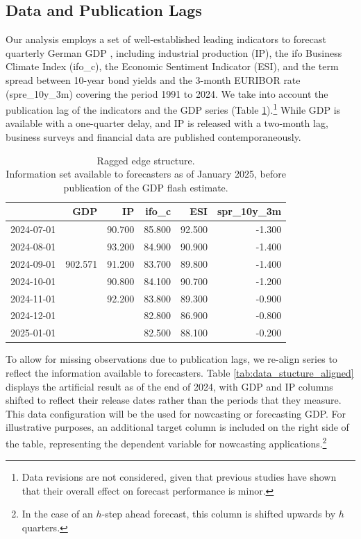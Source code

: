 \documentclass[11pt,a4paper]{article}
\begin{document}
\subsection{Data and Publication Lags}
Our analysis employs a set of well-established leading indicators to forecast quarterly German GDP \citep{Drechsel2012financial,Heinisch2018bottom}, including industrial production (IP), the ifo Business Climate Index (ifo\_c), the Economic Sentiment Indicator (ESI), and the term spread between 10-year bond yields and the 3-month EURIBOR rate (spre\_10y\_3m) covering the period 1991 to 2024. 
We take into account the publication lag of the indicators and the GDP series (Table \ref{tab:data_stucture}).\footnote{Data revisions are not considered, given that previous studies \citep{Heinisch2019} have shown that their overall effect on forecast performance is minor.} 
While GDP is available with a one-quarter delay, and IP is released with a two-month lag, business surveys and financial data are published contemporaneously.


\begin{table}[ht]
    \caption{Ragged edge structure.\\ Information set available to forecasters as of January 2025, before publication of the GDP flash estimate.} 
    \label{tab:data_stucture}
    \centering
    \begin{tabular}{rrrrrr}
      \hline
     & GDP & IP & ifo\_c & ESI & spr\_10y\_3m \\ 
      \hline
    2024-07-01 &  & 90.700 & 85.800 & 92.500 & -1.300 \\ 
      2024-08-01 &  & 93.200 & 84.900 & 90.900 & -1.400 \\ 
      2024-09-01 &902.571  & 91.200 & 83.700 & 89.800 & -1.400 \\ 
      2024-10-01 &  & 90.800 & 84.100 & 90.700 & -1.200 \\ 
      2024-11-01 &  & 92.200 & 83.800 & 89.300 & -0.900 \\ 
      2024-12-01 &  &  & 82.800 & 86.900 & -0.800 \\ 
      2025-01-01 &  &  & 82.500 & 88.100 & -0.200 \\ 
       \hline
    \end{tabular}
\end{table}


To allow for missing observations due to publication lags, we re-align series to reflect the information available to forecasters. Table \ref{tab:data_stucture_aligned} displays the artificial result as of the end of 2024, with GDP and IP columns shifted to reflect their release dates rather than the periods that they measure. This data configuration will be the used for nowcasting or forecasting GDP. For illustrative purposes, an additional target column is included on the right side of the table, representing the dependent variable for nowcasting applications.\footnote{In the case of an $h$-step ahead forecast, this column is shifted upwards by $h$ quarters.} 
\end{document}
